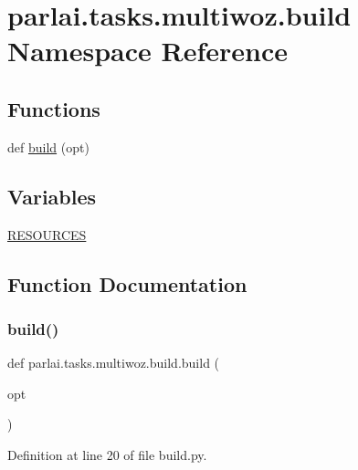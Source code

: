 \hypertarget{namespaceparlai_1_1tasks_1_1multiwoz_1_1build}{}\section{parlai.\+tasks.\+multiwoz.\+build Namespace Reference}
\label{namespaceparlai_1_1tasks_1_1multiwoz_1_1build}
\subsection*{Functions}
\begin{DoxyCompactItemize}
\item 
def \hyperlink{namespaceparlai_1_1tasks_1_1multiwoz_1_1build_acec88589d5259b6f17fad032852ea56a}{build} (opt)
\end{DoxyCompactItemize}
\subsection*{Variables}
\begin{DoxyCompactItemize}
\item 
\hyperlink{namespaceparlai_1_1tasks_1_1multiwoz_1_1build_a7fa5e9b5c2aed52202c27a6f5b2adea2}{R\+E\+S\+O\+U\+R\+C\+ES}
\end{DoxyCompactItemize}


\subsection{Function Documentation}
\mbox{\label{namespaceparlai_1_1tasks_1_1multiwoz_1_1build_acec88589d5259b6f17fad032852ea56a}} 
\subsubsection{\texorpdfstring{build()}{build()}}
{\footnotesize\ttfamily def parlai.\+tasks.\+multiwoz.\+build.\+build (\begin{DoxyParamCaption}\item[{}]{opt }\end{DoxyParamCaption})}



Definition at line 20 of file build.\+py.


